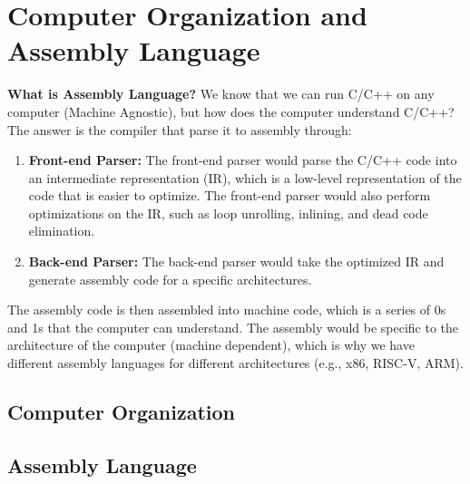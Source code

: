 \documentclass[11pt]{report}
\begin{document}
\chapter{Computer Organization and Assembly Language}
\begin{shaded}
\textbf{What is Assembly Language?} We know that we can run C/C++ on any computer (Machine Agnostic), but how does the computer understand C/C++? The answer is the compiler that parse it to assembly through:

\begin{enumerate}
    \item \textbf{Front-end Parser:} The front-end parser would parse the C/C++ code into an intermediate representation (IR), which is a low-level representation of the code that is easier to optimize. The front-end parser would also perform optimizations on the IR, such as loop unrolling, inlining, and dead code elimination.
    \item \textbf{Back-end Parser:} The back-end parser would take the optimized IR and generate assembly code for a specific architectures.
\end{enumerate}
\end{shaded}
The assembly code is then assembled into machine code, which is a series of 0s and 1s that the computer can understand. The assembly would be specific to the architecture of the computer (machine dependent), which is why we have different assembly languages for different architectures (e.g., x86, RISC-V, ARM).
\section{Computer Organization}

\section{Assembly Language}
\end{document}
